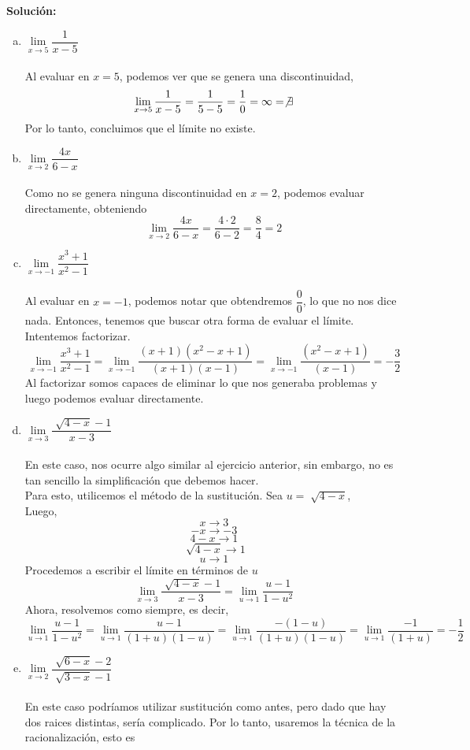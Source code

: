 \documentclass[12pt]{article}
\newenvironment{solucion}
{\begin{mdframed}[backgroundcolor=black!10]
		{\bf Solución:}\\
	}
	{
	\end{mdframed}
}
\newenvironment{preguntas}
{\begin{enumerate}\itemsep12pt
	}
	{
	\end{enumerate}
}
\newcommand{\ra}{\rightarrow}
\begin{document}
\begin{preguntas}
\begin{solucion}
\begin{enumerate}[a)]
\item $\lim\limits_{x \ra 5} \dfrac{1}{x-5}$\\
\\
Al evaluar en $x = 5$, podemos ver que se genera una discontinuidad,
$$\lim\limits_{x \ra 5} \dfrac{1}{x-5} = \dfrac{1}{5-5} = \dfrac{1}{0} = \infty = \not\exists$$
Por lo tanto, concluimos que el límite no existe.
\item $\lim\limits_{x \ra 2} \dfrac{4x}{6-x}$\\
\\
Como no se genera ninguna discontinuidad en $x = 2$, podemos evaluar directamente, obteniendo
$$\lim\limits_{x \ra 2} \dfrac{4x}{6-x} = \dfrac{4 \cdot 2}{6-2} = \dfrac{8}{4} = 2$$
\item $\lim\limits_{x \ra -1} \dfrac{x^3+1}{x^2-1}$\\
\\
Al evaluar en $x = -1$, podemos notar que obtendremos $\dfrac{0}{0}$, lo que no nos dice nada. Entonces, tenemos que buscar otra forma de evaluar el límite. Intentemos factorizar.
$$\lim\limits_{x \ra -1} \dfrac{x^3+1}{x^2-1} = \lim\limits_{x \ra -1} \dfrac{(x+1)(x^2-x+1)}{(x+1)(x-1)} = \lim\limits_{x \ra -1} \dfrac{(x^2-x+1)}{(x-1)} = -\dfrac{3}{2}$$
Al factorizar somos capaces de eliminar lo que nos generaba problemas y luego podemos evaluar directamente.
\item $\lim\limits_{x \ra 3} \dfrac{\sqrt[]{4-x}-1}{x-3}$\\
\\
En este caso, nos ocurre algo similar al ejercicio anterior, sin embargo, no es tan sencillo la simplificación que debemos hacer. \\
Para esto, utilicemos el método de la sustitución. Sea $u = \sqrt[]{4-x}$,\\
Luego,
$$x \ra 3$$
$$-x \ra -3$$
$$4-x \ra 1$$
$$\sqrt[]{4-x} \ra 1$$
$$u \ra 1$$
Procedemos a escribir el límite en términos de $u$
$$\lim\limits_{x \ra 3} \dfrac{\sqrt[]{4-x}-1}{x-3}
= \lim\limits_{u \ra 1} \dfrac{u-1}{1-u^2} $$
Ahora, resolvemos como siempre, es decir,
$$\lim\limits_{u \ra 1} \dfrac{u-1}{1-u^2} 
= \lim\limits_{u \ra 1} \dfrac{u-1}{(1+u)(1-u)}
= \lim\limits_{u \ra 1} \dfrac{-(1-u)}{(1+u)(1-u)}
= \lim\limits_{u \ra 1} \dfrac{-1}{(1+u)}
= -\dfrac{1}{2}$$
\item $\lim\limits_{x \ra 2} \dfrac{\sqrt[]{6-x}-2}{\sqrt[]{3-x}-1}$\\
\\
En este caso podríamos utilizar sustitución como antes, pero dado que hay dos raices distintas, sería complicado. Por lo tanto, usaremos la técnica de la racionalización, esto es

\end{enumerate}
\end{solucion}
\end{preguntas}
\end{document}
